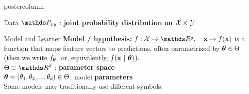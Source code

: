 \documentclass{beamer}
\begin{document}
\begin{frame}[fragile]{}
\begin{columns}
\begin{column}{.31\textwidth}
\begin{beamercolorbox}[center]{postercolumn}
\begin{minipage}{.98\textwidth}
{\begin{myblock}{Data}
$\P_{xy}$ : \textbf{joint probability distribution on} $\mathcal{X} \times \mathcal{Y}$
  
\end{myblock}
\begin{myblock}{Model and Learner}
\textbf{Model / \textbf{hypothesis}: }$f : \Xspace \rightarrow \R^g, \quad \xv \mapsto \fx$ is a function that maps feature vectors to predictions, often parametrized by $\bm{\theta} \in \Theta$ \\ (then we write $f_{\bm{\theta}}$, or, equivalently, $f(\mathbf{x} ~|~ \bm{\theta})$). \\



$\Theta \subset \R^d$ : \textbf{parameter space} \\
  
$\bm{\theta} = (\theta_1, \theta_2, ..., \theta_d) \in \Theta$: model \textbf{parameters}\\
Some models may traditionally use different symbols. \\


\end{myblock}}
\end{minipage}
\end{beamercolorbox}
\end{column}
\end{columns}
\end{frame}
\end{document}
